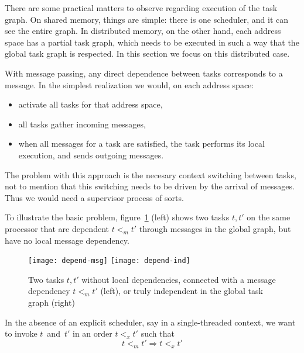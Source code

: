 
There are some practical matters to observe regarding execution of the task graph.
On shared memory, things are simple: there is one scheduler, and
  it can see the entire graph.
In distributed memory, on the other hand, each address space has a partial task graph,
which needs to be executed in such a way that the global task graph
is respected. In this section we focus on this distributed case.

With message passing, any direct dependence between tasks corresponds
to a message. In the simplest realization we would, on each address space:
\begin{itemize}
\item activate all tasks for that address space,
\item all tasks gather incoming messages,
\item when all messages for a task are satisfied, the
  task performs its local execution, and sends outgoing messages.
\end{itemize}
The problem with this approach is the necesary context switching between
tasks, not to mention that this switching needs to be driven by the
arrival of messages. Thus we would need a supervisor process of sorts.

To illustrate the basic problem, figure~\ref{fig:depend-msg} (left)
shows two tasks $t,t'$
on the same processor that are dependent $t\mathbin{<_m}t'$
through messages in the global graph,
but have no local message dependency.
\begin{figure}[ht]
  \leavevmode
  \texttt{[image: depend-msg]}
  \kern1in
  \texttt{[image: depend-ind]}
  \caption{Two tasks $t,t'$ without local dependencies, connected with
    a message dependency $t\mathbin{<_m}t'$ (left), or truly
    independent in the global task graph (right)}
  \label{fig:depend-msg}
\end{figure}
In the absence of an explicit scheduler, say in a single-threaded context,
we want to invoke $t$~and~$t'$ in an order $t\mathbin{<_x}t'$ such that
\[ t\mathbin{<_m}t' \Rightarrow t\mathbin{<_x}t' \]

